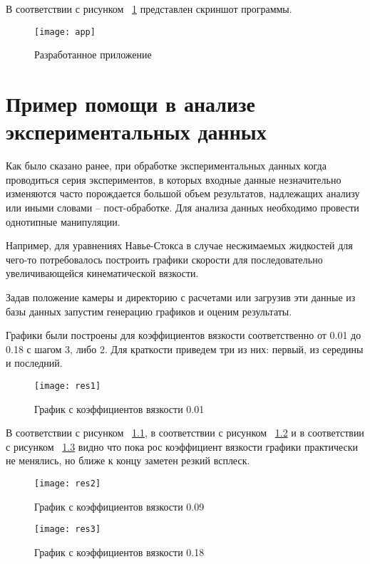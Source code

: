 \documentclass[14pt]{extreport}
\begin{document}
В соответствии с рисунком ~\ref{fig15} представлен скриншот программы. 
\begin{figure}[H]
	\centerline{\texttt{[image: app]}}
	\caption{Разработанное приложение}
	\label{fig15}
\end{figure}


\chapter{Пример помощи в анализе экспериментальных данных}

Как было сказано ранее, при обработке экспериментальных данных когда проводиться серия экспериментов, в которых входные данные незначительно изменяются часто порождается большой объем результатов, надлежащих анализу или иными словами -- пост-обработке. Для анализа данных необходимо провести однотипные манипуляции. 

Например, для уравнениях Навье-Стокса в случае несжимаемых жидкостей для чего-то потребовалось построить графики скорости для последовательно увеличивающейся кинематической вязкости. 

Задав положение камеры и директорию с расчетами или загрузив эти данные из базы данных запустим генерацию графиков и оценим результаты. 

Графики были построены для коэффициентов вязкости соответственно от 0.01 до 0.18 с шагом 3, либо 2. Для краткости приведем три из них: первый, из середины и последний.


\begin{figure}[H]
	\centerline{\texttt{[image: res1]}}
	\caption{График с коэффициентов вязкости 0.01}
	\label{fig16}
\end{figure}

В соответствии с рисунком ~\ref{fig16}, в соответствии с рисунком ~\ref{fig17} и в соответствии с рисунком ~\ref{fig18} видно что пока рос коэффициент вязкости графики практически не менялись, но ближе к концу заметен резкий всплеск.

\begin{figure}[H]
	\centerline{\texttt{[image: res2]}}
	\caption{График с коэффициентов вязкости 0.09}
	\label{fig17}
\end{figure}

\begin{figure}[H]
	\centerline{\texttt{[image: res3]}}
	\caption{График с коэффициентов вязкости 0.18}
	\label{fig18}
\end{figure}
\end{document}
